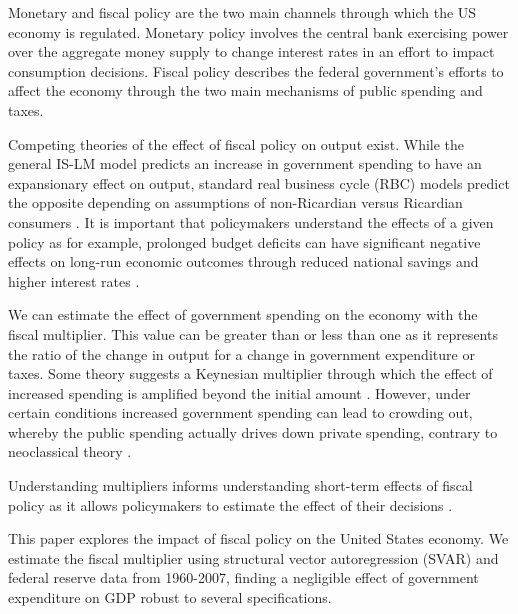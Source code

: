 
Monetary and fiscal policy are the two main channels through which the US economy is regulated.  Monetary policy involves the central bank exercising power over the aggregate money supply to change interest rates in an effort to impact consumption decisions.  Fiscal policy describes the federal government's efforts to affect the economy through the two main mechanisms of public spending and taxes.  



Competing theories of the effect of fiscal policy on output exist.  While the general IS-LM model predicts an increase in government spending to have an expansionary effect on output, standard real business cycle (RBC) models predict the opposite depending on assumptions of non-Ricardian versus Ricardian consumers \parencite{gali2007understanding}.  It is important that policymakers understand the effects of a given policy as for example, prolonged budget deficits can have significant negative effects on long-run economic outcomes through reduced national savings and higher interest rates \parencite{gale2003economic}. %

We can estimate the effect of government spending on the economy with the fiscal multiplier.  
This value can be greater than or less than one as it represents the ratio of the change in output for a change in government expenditure or taxes.  Some theory suggests a Keynesian multiplier through which the effect of increased spending is amplified beyond the initial amount \parencite{barro2011macroeconomic}.  However, under certain conditions increased government spending can lead to crowding out, whereby the public spending actually drives down private spending, contrary to neoclassical theory \parencite{berge2021fiscal}.

Understanding multipliers informs understanding short-term effects of fiscal policy as it allows policymakers to estimate the effect of their decisions \parencite{eyraud2013challenge}.




This paper explores the impact of fiscal policy on the United States economy.  We estimate the fiscal multiplier using structural vector autoregression (SVAR) and federal reserve data from 1960-2007, finding a negligible effect of government expenditure on GDP robust to several specifications.